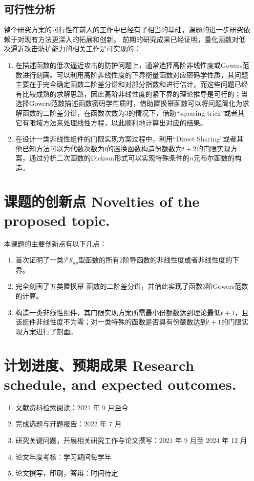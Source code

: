 \documentclass[a4paper,zihao=-4,AutoFakeBold]{ctexart}
\begin{document}
\subsection{可行性分析}
整个研究方案的可行性在前人的工作中已经有了相当的基础，课题的进一步研究依赖于对现有方法更深入的拓展和创新。
前期的研究成果已经证明，量化函数对低次逼近攻击防护能力的相关工作是可实现的：
\begin{enumerate}[label=\arabic{*})]
    \item 在描述函数的低次逼近攻击的防护问题上，通常选择高阶非线性度或Gowers范数进行刻画。可以利用高阶非线性度的下界衡量函数对应密码学性质，其问题主要在于完全确定函数二阶差分谱和对部分指数和进行估计，而这些问题已经有比较成熟的求解思路，因此高阶非线性度的紧下界的理论推导是可行的；当选择Gowers范数描述函数密码学性质时，借助置换幂函数可以将问题简化为求解函数的二阶差分谱，在函数次数为3的情况下，借助``squaring trick''或者其它有限域方法来处理线性方程，以此顺利地计算出对应的结果。
    \item 在设计一类非线性组件的门限实现方案过程中，利用``Direct Sharing''或者其他已知方法可以为代数次数为$t$的置换函数构造份额数为$t+2$的门限实现方案，通过分析二次函数的Dickson形式可以实现特殊条件的$n$元布尔函数的构造。
\end{enumerate}


\section{课题的创新点 Novelties of the proposed topic.}
本课题的主要创新点有以下几点：
\begin{enumerate}[label=(\arabic{*})]
    \item 首次证明了一类$\mathcal{PS}_{ap}$型函数的所有$2$阶导函数的非线性度或者非线性度的下界。
    \item 完全刻画了五类置换幂 函数的二阶差分谱，并借此实现了函数3阶Gowers范数的计算。
    \item 构造一类非线性组件，其门限实现方案所需最小份额数达到理论最低$t+1$，且该组件非线性度不为零；对一类特殊的函数是否具有份额数达到$t+1$的门限实现方案进行了刻画。
\end{enumerate}


\section{计划进度、预期成果 Research schedule, and expected outcomes.}
\begin{enumerate}[label=\arabic{*})]
    \item 文献资料检索阅读：2021 年 9 月至今
    \item 完成选题与开题报告：2022 年 7 月
    \item 研究关键问题，开展相关研究工作与论文撰写：2021 年 9 月至 2024 年 12 月
    \item 论文年度考核：学习期间每学年
    \item 论文撰写，印刷，答辩：时间待定
\end{enumerate}
\end{document}
